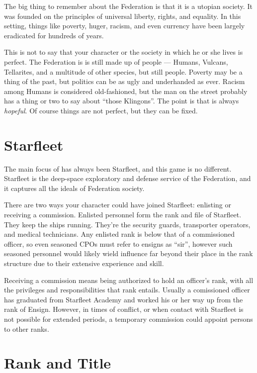 \documentclass[12pt,titlepage,openany]{book}
\begin{document}
The big thing to remember about the Federation is that it is a utopian society.
It was founded on the principles of universal liberty, rights, and equality. In
this setting, things like poverty, huger, racism, and even currency have been
largely eradicated for hundreds of years.

This is not to say that your character or the society in which he or she lives
is perfect. The Federation is is still made up of people --- Humans, Vulcans,
Tellarites, and a multitude of other species, but still people. Poverty may be
a thing of the past, but politics can be as ugly and underhanded as ever.
Racism among Humans is considered old-fashioned, but the man on the street
probably has a thing or two to say about ``those Klingons''. The point is that
\StarTrek{} is always \emph{hopeful}. Of course things are not perfect, but
they can be fixed.

\section{Starfleet}

The main focus of \StarTrek{} has always been Starfleet, and this game is no
different. Starfleet is the deep-space exploratory and defense service of the
Federation, and it captures all the ideals of Federation society.

There are two ways your character could have joined Starfleet: enlisting or
receiving a commission. Enlisted personnel form the rank and file of Starfleet.
They keep the ships running. They're the security guards, transporter operators,
and medical technicians. Any enlisted rank is below that of a commissioned
officer, so even seasoned CPOs must refer to ensigns as ``sir'', however such
seasoned personnel would likely wield influence far beyond their place in the
rank structure due to their extensive experience and skill.

Receiving a commission means being authorized to hold an officer's rank, with
all the privileges and responsibilities that rank entails. Usually a
comissioned officer has graduated from Starfleet Academy and worked his or her
way up from the rank of Ensign. However, in times of conflict, or when contact
with Starfleet is not possible for extended periods, a temporary commission
could appoint persons to other ranks.

\section{Rank and Title}\label{sec:orders}
\end{document}
